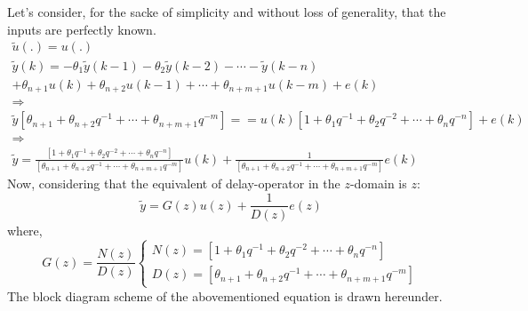 Let's consider, for the sacke of simplicity and without loss of generality, that the inputs are perfectly known.
\[
\begin{array}{l}
\tilde{u}(.) = u(.) \\ [2ex]
\tilde{y}(k)= -\theta_1 \tilde{y}(k - 1) - \theta_2 \tilde{y}(k - 2) - \cdots -\tilde{y}(k - n) \\[1ex] + \theta_{n+1} u(k) + \theta_{n+2} u(k - 1) + \cdots + \theta_{n+m+1} u(k - m) + e(k) \\[2ex]
\Rightarrow \\[2ex]
\tilde{y}\left[\theta_{n+1} + \theta_{n+2} q^{-1} + \cdots + \theta_{n+m+1} q^{-m}\right] =
= u(k)\left[1 + \theta_1 q^{-1} + \theta_2 q^{-2} + \cdots + \theta_n q^{-n}\right] + e(k)\\[2ex]
\Rightarrow \\[2ex]
\tilde{y}
= \frac{\left[1 + \theta_1 q^{-1} + \theta_2 q^{-2} + \cdots + \theta_n q^{-n}\right]}{\left[\theta_{n+1} + \theta_{n+2} q^{-1} + \cdots + \theta_{n+m+1} q^{-m}\right]}u(k) 
+ \frac{1}{\left[\theta_{n+1} + \theta_{n+2} q^{-1} + \cdots + \theta_{n+m+1} q^{-m}\right]}e(k)
\end{array}
\]
Now, considering that the equivalent of delay-operator in the \(z\)-domain is \(z\):
\[
\tilde{y} = G(z) u(z) + \frac{1}{D(z)} e(z)
\]
where,
\[
G(z) = \frac{N(z)}{D(z)} 
\begin{cases}
N(z) = \left[1 + \theta_1 q^{-1} + \theta_2 q^{-2} + \cdots + \theta_n q^{-n}\right] \\
D(z) = \left[\theta_{n+1} + \theta_{n+2} q^{-1} + \cdots + \theta_{n+m+1} q^{-m}\right]
\end{cases}
\]
The block diagram scheme of the abovementioned equation is drawn hereunder.\\
